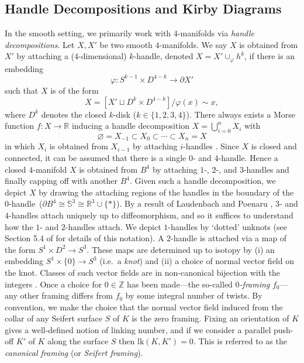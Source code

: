 \documentclass[pdflatex,sn-mathphys-num]{sn-jnl}
\theoremstyle{thmstyleone}%
\theoremstyle{thmstyletwo}%
\theoremstyle{thmstylethree}%
\newcommand{\lk}{\mathrm{lk}}
\theoremstyle{remark}
\begin{document}
\subsection{Handle Decompositions and Kirby Diagrams}\label{sec:prelims-handles}
In the smooth setting, we primarily work with $4$-manifolds via \emph{handle decompositions}. Let $X,X'$ be two smooth $4$-manifolds. We say $X$ is obtained from $X'$ by attaching a ($4$-dimensional) $k$-handle, denoted $X=X'\cup_{\varphi} h^k$, if there is an embedding 
\[\varphi:S^{k-1}\times D^{4-k}\to\partial X'\]
such that $X$ is of the form 
\[X=\left[X'\sqcup D^k\times D^{4-k} \right]/\varphi(x)\sim x,\] where $D^k$ denotes the closed $k$-disk ($k\in\{1,2,3,4\}$). There always exists a Morse function $f\colon X\to\mathbb{R}$ inducing a handle decomposition $X=\bigcup_{i=0}^n X_i$ with 
\[\varnothing=X_{-1}\subset X_0\subset\cdots\subset X_n=X\] 
in which $X_i$ is obtained from $X_{i-1}$ by attaching $i$-handles \cite{milnorMorseTheory}. Since $X$ is closed and connected, it can be assumed that there is a single $0$- and $4$-handle. Hence a closed $4$-manifold $X$ is obtained from $B^4$ by attaching $1$-, $2$-, and $3$-handles and finally capping off with another $B^4$. Given such a handle decomposition, we depict $X$ by drawing the attaching regions of the handles in the boundary of the $0$-handle~($\partial B^4\cong \mathbb{S}^3\cong\mathbb{R}^3\cup\{*\}$). By a result of Laudenbach and Poenaru \cite{LaudenbachPoenaru}, $3$- and $4$-handles attach uniquely up to diffeomorphism, and so it suffices to understand how the $1$- and $2$-handles attach. We depict $1$-handles by `dotted' unknots (see Section 5.4 of \cite{GompfStipsicz} for details of this notation). A $2$-handle is attached via a map of the form $S^1\times D^2\to S^3$. These maps are determined up to isotopy by (i) an embedding $S^1\times\{0\}\to S^3$ (i.e.\ a \emph{knot}) and (ii) a choice of normal vector field on the knot. Classes of such vector fields are in non-canonical bijection with the integers \cite{GompfStipsicz}. Once a choice for $0\in\mathbb{Z}$ has been made---the so-called \emph{$0$-framing} $f_0$---any other framing differs from $f_0$ by some integral number of twists. By convention, we make the choice that the normal vector field induced from the collar of any Seifert surface $S$ of $K$ is the zero framing. Fixing an orientation of $K$ gives a well-defined notion of linking number, and if we consider a parallel push-off $K'$ of $K$ along the surface $S$ then $\lk(K,K')=0$. This is referred to as the \emph{canonical framing} (or \emph{Seifert framing}).
\end{document}

